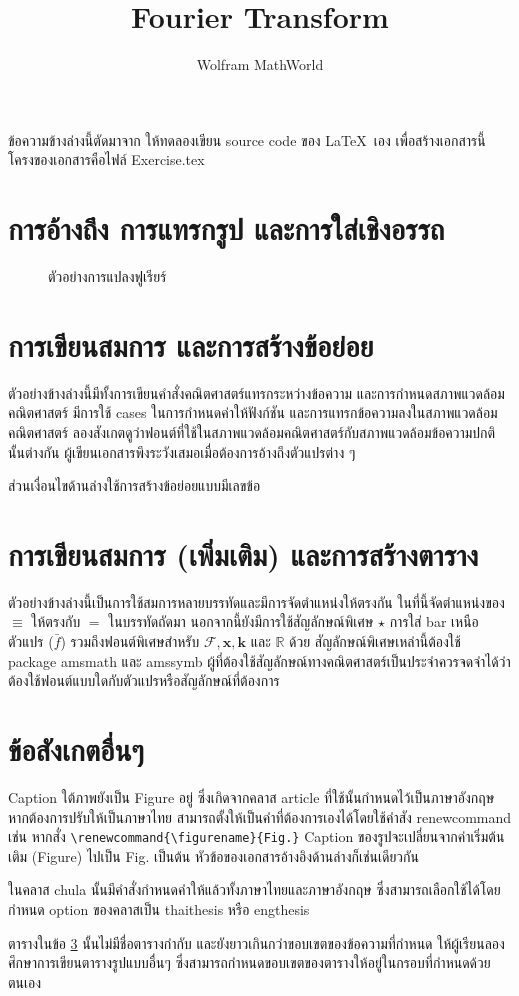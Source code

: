 \documentclass[a4paper,12pt]{article}
\title{Fourier Transform}
\author{Wolfram MathWorld}
\date{}
\begin{document}
\maketitle
ข้อความข้างล่างนี้ตัดมาจาก \cite{WolframForier} ให้ทดลองเขียน source code ของ \LaTeX~เอง เพื่อสร้างเอกสารนี้ โครงของเอกสารคือไฟล์ Exercise.tex

\section{การอ้างถึง การแทรกรูป และการใส่เชิงอรรถ}
\begin{figure}[h]
\caption{ตัวอย่างการแปลงฟูเรียร์}
\label{Fig:TransformExample}
\end{figure}

\section{การเขียนสมการ และการสร้างข้อย่อย}
ตัวอย่างข้างล่างนี้มีทั้งการเขียนคำสั่งคณิตศาสตร์แทรกระหว่างข้อความ และการกำหนดสภาพแวดล้อมคณิตศาสตร์ มีการใช้ cases ในการกำหนดค่าให้ฟังก์ชัน และการแทรกข้อความลงในสภาพแวดล้อมคณิตศาสตร์ ลองสังเกตดูว่าฟอนต์ที่ใช้ในสภาพแวดล้อมคณิตศาสตร์กับสภาพแวดล้อมข้อความปกตินั้นต่างกัน ผู้เขียนเอกสารพึงระวังเสมอเมื่อต้องการอ้างถึงตัวแปรต่าง ๆ

ส่วนเงื่อนไขด้านล่างใช้การสร้างข้อย่อยแบบมีเลขข้อ

\section{การเขียนสมการ (เพิ่มเติม) และการสร้างตาราง}
\label{Sec:Table}
ตัวอย่างข้างล่างนี้เป็นการใช้สมการหลายบรรทัดและมีการจัดตำแหน่งให้ตรงกัน ในที่นี้จัดตำแหน่งของ $\equiv$ ให้ตรงกับ $=$ ในบรรทัดถัดมา นอกจากนี้ยังมีการใช้สัญลักษณ์พิเศษ $\star$ การใส่ bar เหนือตัวแปร ($\bar{f}$) รวมถึงฟอนต์พิเศษสำหรับ $\mathcal{F}, \mathbf{x}, \mathbf{k}$ และ $\mathbb{R}$ ด้วย สัญลักษณ์พิเศษเหล่านี้ต้องใช้ package amsmath และ amssymb ผู้ที่ต้องใช้สัญลักษณ์ทางคณิตศาสตร์เป็นประจำควรจดจำได้ว่าต้องใช้ฟอนต์แบบใดกับตัวแปรหรือสัญลักษณ์ที่ต้องการ

\section{ข้อสังเกตอื่นๆ}
Caption ใต้ภาพยังเป็น Figure อยู่ ซึ่งเกิดจากคลาส article ที่ใช้นั้นกำหนดไว้เป็นภาษาอังกฤษ หากต้องการปรับให้เป็นภาษาไทย สามารถตั้งให้เป็นคำที่ต้องการเองได้โดยใช้คำสัง renewcommand เช่น หากสั่ง \lstinline|\renewcommand{\figurename}{Fig.}| Caption ของรูปจะเปลี่ยนจากค่าเริ่มต้นเติม (Figure) ไปเป็น Fig. เป็นต้น หัวข้อของเอกสารอ้างอิงด้านล่างก็เช่นเดียวกัน

ในคลาส chula นั้นมีคำสั่งกำหนดคำให้แล้วทั้งภาษาไทยและภาษาอังกฤษ ซึ่งสามารถเลือกใช้ได้โดยกำหนด option ของคลาสเป็น thaithesis หรือ engthesis

ตารางในข้อ \ref{Sec:Table} นั้นไม่มีชื่อตารางกำกับ และยังยาวเกินกว่าขอบเขตของข้อความที่กำหนด ให้ผู้เรียนลองศึกษาการเขียนตารางรูปแบบอื่นๆ ซึ่งสามารถกำหนดขอบเขตของตารางให้อยู่ในกรอบที่กำหนดด้วยตนเอง



\end{document}
